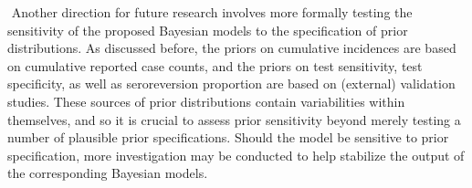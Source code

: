 \newline$ $
Another direction for future research involves more formally testing the sensitivity of the proposed Bayesian models to the specification of prior distributions. As discussed before, the priors on cumulative incidences are based on cumulative reported case counts, and the priors on test sensitivity, test specificity, as well as seroreversion proportion are based on (external) validation studies. These sources of prior distributions contain variabilities within themselves, and so it is crucial to assess prior sensitivity beyond merely testing a number of plausible prior specifications. Should the model be sensitive to prior specification, more investigation may be conducted to help stabilize the output of the corresponding Bayesian models.